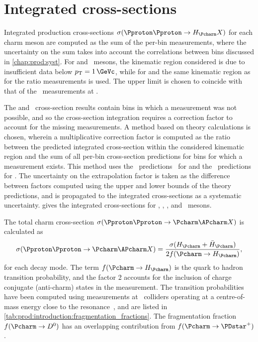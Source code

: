 \section{Integrated cross-sections}
\label{chap:prod:results:integrated}

Integrated production cross-sections $\xsec(\ppToHc{}X)$ for each charm meson
are computed as the sum of the per-bin measurements, where the uncertainty on
the sum takes into account the correlations between bins discussed in
\cref{chap:prod:syst}.
For \PDsplus and \PDstarp\ mesons, the kinematic region considered is
 due to insufficient data below $\pT = \SI{1}{\GeVc}$,
while for \PDzero and \PDplus the same kinematic region as for the ratio
measurements is used.
The upper limit is chosen to coincide with that of the \lhcb\ measurements at
.

The \PDzero and \PDstarp\ cross-section results contain bins in which a
measurement was not possible, and so the cross-section integration requires a
correction factor to account for the missing measurements.
A method based on theory calculations is chosen, wherein a multiplicative
correction factor is computed as the ratio between the predicted integrated
cross-section within the considered kinematic region and the sum of all per-bin
cross-section predictions for bins for which a measurement exists.
This method uses the \nnpdfl\ predictions~\cite{Gauld:2015yia} for \PDzero and
the \fonll\ predictions~\cite{Cacciari:2015fta} for \PDstarp.
The uncertainty on the extrapolation factor is taken as the difference between
factors computed using the upper and lower bounds of the theory predictions,
and is propagated to the integrated cross-sections as a systematic uncertainty.
 gives the integrated
cross-sections for \PDzero, \PDplus, \PDsplus, and \PDstarp\ mesons.

The total charm cross-section $\xsec(\ppToccbarX)$ is calculated as
\begin{equation}
  \xsec{(\ppToccbarX)} = \frac{\xsec(\PHc + \APHc)}{2f(\cToHc)},
\end{equation}
for each decay mode.
The term $f(\cToHc)$ is the quark to hadron transition probability, and the
factor 2 accounts for the inclusion of charge conjugate (anti-charm) states in
the measurement.
The transition probabilities have been computed using measurements at \epem\
colliders operating at a centre-of-mass energy close to the \PUpsilonFourS
resonance~\cite{PDG2008}, and are listed in
\cref{tab:prod:introduction:fragmentation_fractions}.
The fragmentation fraction $f(\decay{\Pcharm}{\PDzero})$ has an overlapping
contribution
from $f(\decay{\Pcharm}{\PDstarp})$.

